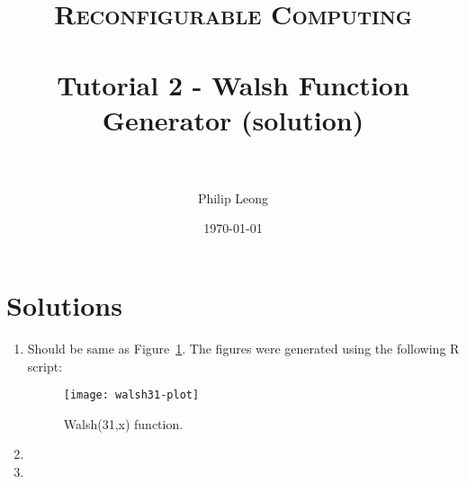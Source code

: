 \documentclass[paper=a4, fontsize=11pt]{scrartcl} %
\title{	
\normalfont \normalsize 
\textsc{Reconfigurable Computing} \\ [25pt] %
\horrule{0.5pt} \\[0.4cm] %
\huge Tutorial 2 - Walsh Function Generator (solution) \\ %
\horrule{2pt} \\[0.5cm] %
}
\author{Philip Leong} %
\date{\normalsize\today} %
\begin{document}
\maketitle %



\newpage
\appendix
\section{Solutions}

\begin{enumerate}
\item Should be same as Figure~\ref{fg:walsh31}. The figures were generated
using the following R script:


\begin{figure}
\begin{center}
\texttt{[image: walsh31-plot]}
\caption{Walsh(31,x) function.}
\label{fg:walsh31}
\end{center}
\end{figure}

\item 



\item 


\end{enumerate}

{}

\end{document}
